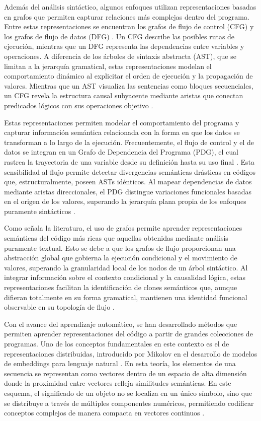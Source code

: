 Además del análisis sintáctico, algunos enfoques utilizan representaciones basadas en grafos que permiten capturar relaciones más complejas dentro del programa. Entre estas representaciones se encuentran los grafos de flujo de control (CFG) y los grafos de flujo de datos (DFG) \cite{Yu2023Graph}. Un CFG describe las posibles rutas de ejecución, mientras que un DFG representa las dependencias entre variables y operaciones. A diferencia de los árboles de sintaxis abstracta (AST), que se limitan a la jerarquía gramatical, estas representaciones modelan el comportamiento dinámico al explicitar el orden de ejecución y la propagación de valores. Mientras que un AST visualiza las sentencias como bloques secuenciales, un CFG revela la estructura causal subyacente mediante aristas que conectan predicados lógicos con sus operaciones objetivo \cite{Yu2023Graph}.

Estas representaciones permiten modelar el comportamiento del programa y capturar información semántica relacionada con la forma en que los datos se transforman a lo largo de la ejecución. Frecuentemente, el flujo de control y el de datos se integran en un Grafo de Dependencia del Programa (PDG), el cual rastrea la trayectoria de una variable desde su definición hasta su uso final \cite{Lu2026CSSG}. Esta sensibilidad al flujo permite detectar divergencias semánticas drásticas en códigos que, estructuralmente, poseen ASTs idénticos. Al mapear dependencias de datos mediante aristas direccionales, el PDG distingue variaciones funcionales basadas en el origen de los valores, superando la jerarquía plana propia de los enfoques puramente sintácticos \cite{Lu2026CSSG}.

Como señala la literatura, el uso de grafos permite aprender representaciones semánticas del código más ricas que aquellas obtenidas mediante análisis puramente textual. Esto se debe a que los grafos de flujo proporcionan una abstracción global que gobierna la ejecución condicional y el movimiento de valores, superando la granularidad local de los nodos de un árbol sintáctico. Al integrar información sobre el contexto condicional y la causalidad lógica, estas representaciones facilitan la identificación de clones semánticos que, aunque difieran totalmente en su forma gramatical, mantienen una identidad funcional observable en su topología de flujo \cite{Yu2023Graph, Lu2026CSSG}.

Con el avance del aprendizaje automático, se han desarrollado métodos que permiten aprender representaciones del código a partir de grandes colecciones de programas. Uno de los conceptos fundamentales en este contexto es el de representaciones distribuidas, introducido por Mikolov en el desarrollo de modelos de embeddings para lenguaje natural \cite{Mikolov2013Distributed}. En esta teoría, los elementos de una secuencia se representan como vectores dentro de un espacio de alta dimensión donde la proximidad entre vectores refleja similitudes semánticas. En este esquema, el significado de un objeto no se localiza en un único símbolo, sino que se distribuye a través de múltiples componentes numéricos, permitiendo codificar conceptos complejos de manera compacta en vectores continuos \cite{Mikolov2013Distributed}.

